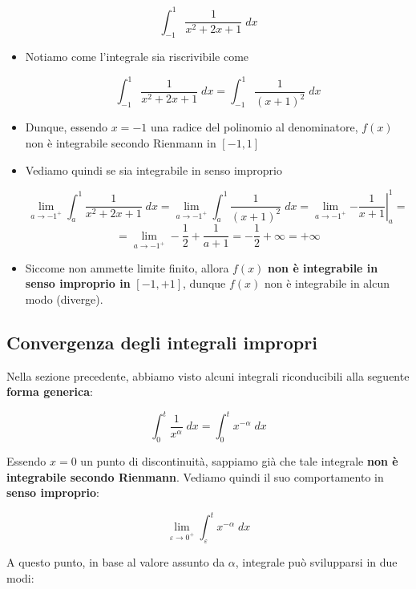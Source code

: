 \documentclass[a4paper, 12pt]{report}
\begin{document}
\begin{itemize}
        \[\int_{-1}^{1} \frac{1}{x^2+2x+1} \; dx\]
        
        \begin{itemize}
            \item Notiamo come l'integrale sia riscrivibile come
            
            \[\int_{-1}^{1} \frac{1}{x^2+2x+1} \; dx = \int_{-1}^{1} \frac{1}{(x+1)^2} \; dx\]
            
            \item Dunque, essendo $x=-1$ una radice del polinomio al denominatore, $f(x)$ non è integrabile secondo Rienmann in $[-1, 1]$
            
            \item Vediamo quindi se sia integrabile in senso improprio
            
            \[\lim_{a \to -1^+} \int_{a}^{1} \frac{1}{x^2+2x+1} \; dx = \lim_{a \to -1^+} \int_{a}^{1} \frac{1}{(x+1)^2} \; dx = \lim_{a \to -1^+} \left . -\frac{1}{x+1} \right |_{a}^{1} =\]
            \[ = \lim_{a \to -1^+} -\frac{1}{2}+\frac{1}{a+1} = -\frac{1}{2} + \infty = +\infty\]
            
            \item Siccome non ammette limite finito, allora $f(x)$ \textbf{non è integrabile in senso improprio in} $[-1, +1]$, dunque $f(x)$ non è integrabile in alcun modo (diverge).
        \end{itemize}
    \end{itemize}
    
    \newpage
    
    \subsection{Convergenza degli integrali impropri}
    
    Nella sezione precedente, abbiamo visto alcuni integrali riconducibili alla seguente \textbf{forma generica}:
    
    \[ \int_{0}^{t} \frac{1}{x^{\alpha}} \; dx = \int_{0}^{t} x^{-\alpha} \; dx\]
    
    Essendo $x=0$ un punto di discontinuità, sappiamo già che tale integrale \textbf{non è integrabile secondo Rienmann}. Vediamo quindi il suo comportamento in \textbf{senso improprio}:
    
    \[ \lim_{\varepsilon \to 0^+} \int_{\varepsilon}^{t} x^{-\alpha} \; dx\]
    
    A questo punto, in base al valore assunto da $\alpha$, integrale può svilupparsi in due modi:
    
\end{document}
